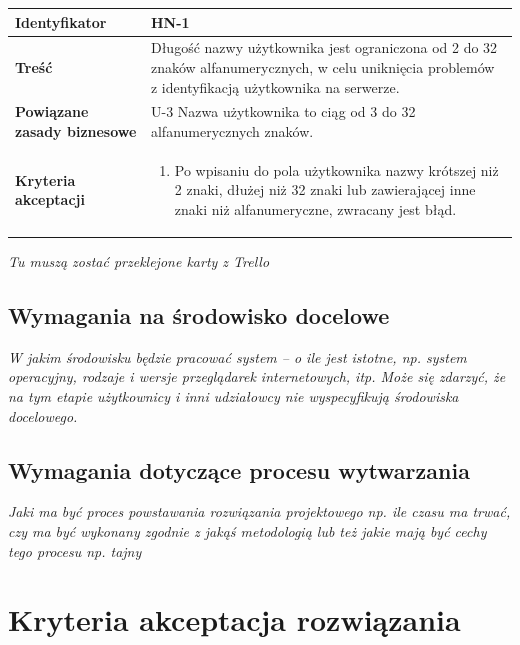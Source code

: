 \documentclass[11pt,oneside,a4paper,titlepage,onecolumn]{article}
\begin{document}
\begin{tabular}{ | l | l | }
	\hline
		\textbf{Identyfikator} & 
		HN-1
		\\
		
	\hline
		\textbf{Treść} & \parbox[t]{13cm}{
			Długość nazwy użytkownika jest ograniczona od 2 do 32 znaków alfanumerycznych, w celu uniknięcia problemów z identyfikacją użytkownika na serwerze.
		}\\
		 
	\hline
		\parbox[t]{4cm}{\textbf{Powiązane zasady biznesowe}} & \parbox[t]{13cm}{
			U-3 Nazwa użytkownika to ciąg od 3 do 32 alfanumerycznych znaków.
		}\\
		
	\hline
		\parbox[t]{4cm}{\textbf{Kryteria akceptacji}} & \parbox[t]{13cm}{
			\begin{enumerate}
				\item Po wpisaniu do pola użytkownika nazwy krótszej niż 2 znaki, dłużej niż 32 znaki lub zawierającej inne znaki niż alfanumeryczne, zwracany jest błąd.
			\end{enumerate}
			}
		\\

	\hline
\end{tabular}

\textit{Tu muszą zostać przeklejone karty z Trello}

\subsection{Wymagania na środowisko docelowe}

\textit{W jakim środowisku będzie pracować system – o ile jest istotne, np. system operacyjny, rodzaje i wersje przeglądarek internetowych, itp. Może się zdarzyć, że na tym etapie użytkownicy i inni udziałowcy nie wyspecyfikują środowiska docelowego.}

\subsection{Wymagania dotyczące procesu wytwarzania}

\textit{Jaki ma być proces powstawania rozwiązania projektowego np. ile czasu ma trwać, czy ma być wykonany zgodnie z jakąś metodologią lub też jakie mają być cechy tego procesu np. tajny}

\section{Kryteria akceptacja rozwiązania}
\end{document}
